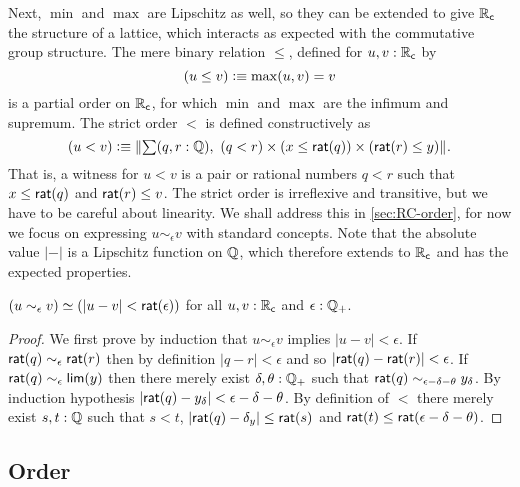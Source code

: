 Next, $\min$ and $\max$ are Lipschitz as well, so they can be extended to give $\mathbb{R}_\mathsf{c}$ the
structure of a lattice, which interacts as expected with the commutative group structure.
The mere binary relation $\leq$, defined for $u, v : \mathbb{R}_\mathsf{c}$ by
%
\begin{equation*}
  (u \leq v) \vcentcolon\equiv \max(u,v) = v
\end{equation*}
%
is a partial order on $\mathbb{R}_\mathsf{c}$, for which $\min$ and $\max$ are the infimum and supremum. The
strict order $<$ is defined constructively as
%
\begin{equation*}
  (u < v) \defeq
  \brck{\sm{q, r : \Q} (q < r) \times (x \leq \rcrat(q)) \times (\rcrat(r) \leq y)}.
\end{equation*}
%
That is, a witness for $u < v$ is a pair or rational numbers $q < r$ such that $x \leq
\mathsf{rat}(q)$ and $\mathsf{rat}(r) \leq v$. The strict order is irreflexive and transitive, but we
have to be careful about linearity. We shall address this in \autoref{sec:RC-order}, for
now we focus on expressing $u \sim_\epsilon v$ with standard concepts. Note that the
absolute value $|{-}|$ is a Lipschitz function on $\mathbb{Q}$, which therefore extends to $\mathbb{R}_\mathsf{c}$
and has the expected properties.

\begin{thm} \label{RC-sim-eqv-le}
  $(u \sim_\epsilon v) \simeq (|u - v| < \mathsf{rat}(\epsilon))$
  for all $u, v : \mathbb{R}_\mathsf{c}$ and $\epsilon : \mathbb{Q}_{+}$.
\end{thm}

\begin{proof}
  We first prove by induction that $u \sim_\epsilon v$ implies $|u - v| < \epsilon$. If
  $\mathsf{rat}(q) \sim_\epsilon \mathsf{rat}(r)$ then by definition $|q - r| < \epsilon$ and so
  $|\mathsf{rat}(q) - \mathsf{rat}(r)| < \epsilon$. If $\mathsf{rat}(q) \sim_\epsilon \mathsf{lim}(y)$ then there
  merely exist $\delta, \theta : \mathbb{Q}_{+}$ such that $\mathsf{rat}(q) \sim_{\epsilon - \delta -
    \theta} y_\delta$. By induction hypothesis $|\mathsf{rat}(q) - y_\delta| < \epsilon - \delta
  - \theta$. By definition of $<$ there merely exist $s, t : \mathbb{Q}$ such that $s < t$,
  $|\mathsf{rat}(q) - \delta_y| \leq \mathsf{rat}(s)$ and $\mathsf{rat}(t) \leq \mathsf{rat}(\epsilon - \delta -
  \theta)$.


\end{proof}




\subsection{Order}
\label{sec:RC-order}

